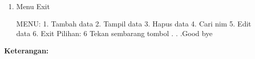 \begin{enumerate}
\begin{lcverbatim}
MENU:
1. Tambah data
2. Tampil data
3. Hapus data
4. Cari nim
5. Edit data
6. Exit
Pilihan: 4
NIM yang akan dicari: 011042
"NIMNamaIPK"
"012042Arif H3.6 "
Tekan sembarang tombol . . .
\end{lcverbatim}
\item
Menu Exit

\begin{lcverbatim}
MENU:
1. Tambah data
2. Tampil data
3. Hapus data
4. Cari nim
5. Edit data
6. Exit
Pilihan: 6
Tekan sembarang tombol . . .Good bye
\end{lcverbatim}

\end{enumerate}

\textbf{Keterangan:}

\begin{itemize}


\end{itemize}
